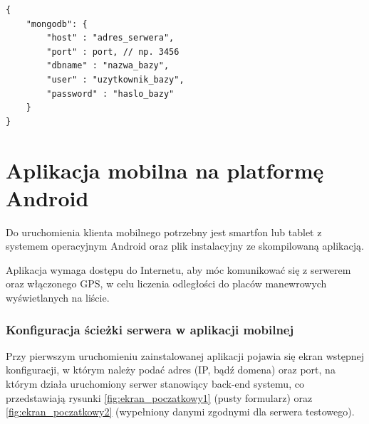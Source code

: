 \documentclass[twoside,a4paper,openright,12pt]{book}
\begin{document}
\begin{lstlisting}[frame=single,label={lst:dbconfig},caption=Domyślna zawartość pliku z konfiguracją połączenia do bazy danych -- plik: /config.json]
{
	"mongodb": {
		"host" : "adres_serwera",
		"port" : port, // np. 3456
		"dbname" : "nazwa_bazy",
		"user" : "uzytkownik_bazy",
		"password" : "haslo_bazy"
	}
}
\end{lstlisting}


\section{Aplikacja mobilna na platformę Android}

Do uruchomienia klienta mobilnego potrzebny jest smartfon lub tablet z systemem operacyjnym Android oraz plik instalacyjny ze skompilowaną aplikacją.

Aplikacja wymaga dostępu do Internetu, aby móc komunikować się z serwerem oraz włączonego GPS, w celu liczenia odległości do placów manewrowych wyświetlanych na liście.


\subsubsection{Konfiguracja ścieżki serwera w aplikacji mobilnej}
\label{konfiguracja_adresu_serwera}

Przy pierwszym uruchomieniu zainstalowanej aplikacji pojawia się ekran wstępnej konfiguracji, w którym należy podać adres (IP, bądź domena) oraz port, na którym działa uruchomiony serwer stanowiący back-end systemu, co przedstawiają rysunki \ref{fig:ekran_poczatkowy1} (pusty formularz) oraz \ref{fig:ekran_poczatkowy2} (wypełniony danymi zgodnymi dla serwera testowego).
\end{document}
